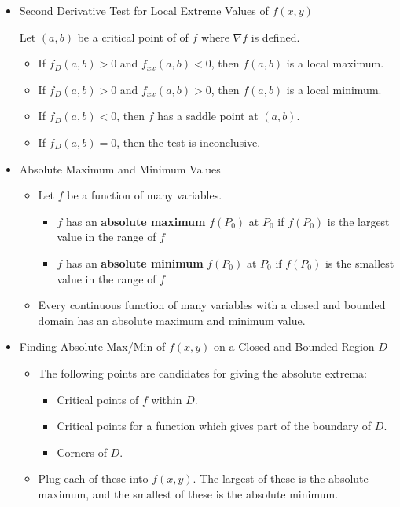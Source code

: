 \documentclass[12pt]{article}
\newcommand{\<}{\left<}
\renewcommand{\>}{\right>}
\begin{document}
\begin{itemize}
  \item Second Derivative Test for Local Extreme Values of $f(x,y)$

    Let $(a,b)$ be a critical point of of $f$ where $\nabla f$ is defined.
    \begin{itemize}
      \item If $f_D(a,b)>0$ and $f_{xx}(a,b)<0$, then $f(a,b)$ is a local maximum.
      \item If $f_D(a,b)>0$ and $f_{xx}(a,b)>0$, then $f(a,b)$ is a local minimum.
      \item If $f_D(a,b)<0$, then $f$ has a saddle point at $(a,b)$.
      \item If $f_D(a,b)=0$, then the test is inconclusive.
    \end{itemize}

  \newpage

  \item Absolute Maximum and Minimum Values
  
    \begin{itemize}
    \item Let $f$ be a function of many variables.
      \begin{itemize}
      \item $f$ has an \textbf{absolute maximum} $f(P_0)$ at $P_0$ if $f(P_0)$ is the largest value in the range of $f$
      \item $f$ has an \textbf{absolute minimum} $f(P_0)$ at $P_0$ if $f(P_0)$ is the smallest value in the range of $f$
      \end{itemize}
    \item Every continuous function of many variables with a closed and bounded domain has an absolute maximum and minimum value.
    \end{itemize}
    
  \item Finding Absolute Max/Min of $f(x,y)$ on a Closed and Bounded Region $D$
    \begin{itemize}
      \item The following points are candidates for giving the absolute extrema:
        \begin{itemize}
          \item Critical points of $f$ within $D$.
          \item Critical points for a function which gives part of the boundary of $D$.
          \item Corners of $D$.
        \end{itemize}
      \item Plug each of these into $f(x,y)$. The largest of these is the absolute maximum, and the smallest of these is the absolute minimum.
    \end{itemize}
    

\end{itemize}
\end{document}
